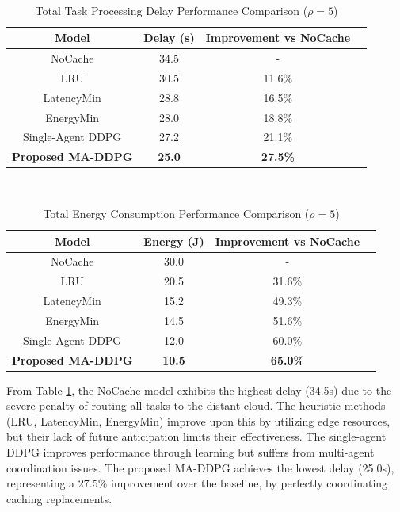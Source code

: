 \documentclass[12pt,a4paper]{report}
\begin{document}
\begin{table}[ht]
\centering
\caption{Total Task Processing Delay Performance Comparison ($\rho=5$)}\\[0.2cm]
\label{tab:delay_results}
\begin{tabular}{|c|c|c|c|}
\hline
\textbf{Model} & \textbf{Delay (s)} & \textbf{Improvement vs NoCache} \\ 
\hline
NoCache      & 34.5 & - \\ 
LRU          & 30.5 & 11.6\% \\ 
LatencyMin   & 28.8 & 16.5\% \\ 
EnergyMin    & 28.0 & 18.8\% \\ 
Single-Agent DDPG & 27.2 & 21.1\% \\ 
\textbf{Proposed MA-DDPG} & \textbf{25.0} & \textbf{27.5\%} \\ 
\hline
\end{tabular}
\end{table}

\FloatBarrier

\begin{table}[ht]
\centering
\caption{Total Energy Consumption Performance Comparison ($\rho=5$)}\\[0.2cm]
\label{tab:energy_results}
\begin{tabular}{|c|c|c|c|}
\hline
\textbf{Model} & \textbf{Energy (J)} & \textbf{Improvement vs NoCache} \\ 
\hline
NoCache      & 30.0 & - \\ 
LRU          & 20.5 & 31.6\% \\ 
LatencyMin   & 15.2 & 49.3\% \\ 
EnergyMin    & 14.5 & 51.6\% \\ 
Single-Agent DDPG & 12.0 & 60.0\% \\ 
\textbf{Proposed MA-DDPG} & \textbf{10.5} & \textbf{65.0\%} \\ 
\hline
\end{tabular}
\end{table}

\FloatBarrier

From Table \ref{tab:delay_results}, the NoCache model exhibits the highest delay (34.5s) due to the severe penalty of routing all tasks to the distant cloud. The heuristic methods (LRU, LatencyMin, EnergyMin) improve upon this by utilizing edge resources, but their lack of future anticipation limits their effectiveness. The single-agent DDPG improves performance through learning but suffers from multi-agent coordination issues. The proposed MA-DDPG achieves the lowest delay (25.0s), representing a 27.5\% improvement over the baseline, by perfectly coordinating caching replacements.
\end{document}
